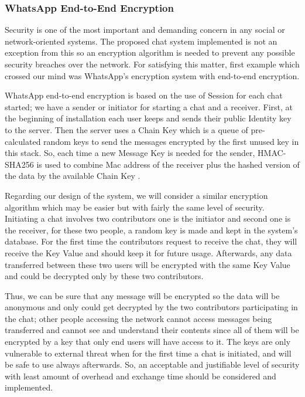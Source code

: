 \documentclass{article}
\begin{document}
\subsubsection{WhatsApp End-to-End Encryption}

Security is one of the most important and demanding concern in any social or network-oriented systems. The proposed chat system implemented is not an exception from this so an encryption algorithm is needed to prevent any possible security breaches over the network. For satisfying this matter, first example which crossed our mind was WhatsApp’s encryption system with end-to-end encryption. \par
WhatsApp end-to-end encryption is based on the use of Session for each chat started; we have a sender or initiator for starting a chat and a receiver. First, at the beginning of installation each user keeps and sends their public Identity key to the server. Then the server uses a Chain Key which is a queue of pre-calculated random keys to send the messages encrypted by the first unused key in this stack. So, each time a new Message Key is needed for the sender, HMAC-SHA256 is used to combine Mac address of the receiver plus the hashed version of the data by the available Chain Key \cite{WhatsApp1}. \par
Regarding our design of the system, we will consider a similar encryption algorithm which may be easier but with fairly the same level of security. Initiating a chat involves two contributors one is the initiator and second one is the receiver, for these two people, a random key is made and kept in the system’s database. For the first time the contributors request to receive the chat, they will receive the Key Value and should keep it for future usage. Afterwards, any data transferred between these two users will be encrypted with the same Key Value and could be decrypted only by these two contributors. \par
Thus, we can be sure that any message will be encrypted so the data will be anonymous and only could get decrypted by the two contributors participating in the chat; other people accessing the network cannot access messages being transferred and cannot see and understand their contents since all of them will be encrypted by a key that only end users will have access to it. The keys are only vulnerable to external threat when for the first time a chat is initiated, and will be safe to use always afterwards. So, an acceptable and justifiable level of security with least amount of overhead and exchange time should be considered and implemented. 
\end{document}
